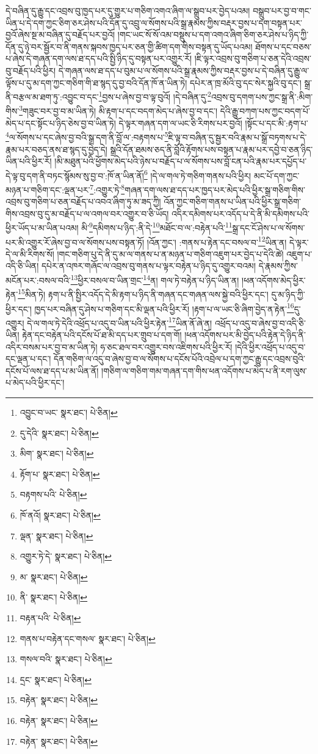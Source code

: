 དེ་བཞིན་དུ་རྒྱུ་དང་འབྲས་བུ་ཁྱད་པར་དུ་གྱུར་པ་གཅིག་འགའ་ཞིག་ལ་སྒྲུབ་པར་བྱེད་པའམ། བསྒྲུབ་པར་བྱ་བ་གང་ཡིན་པ་དེ་དག་ཀྱང་ཅིག་ཅར་ཤེས་པའི་དོན་དུ་འབྲུ་ལ་སོགས་པའི་སྒྲ་རྣམས་ཀྱིས་བརྡར་བྱས་པ་དག་བསྟན་པར་བྱའོ་ཞེས་སྔ་མ་བཞིན་དུ་བརྗོད་པར་བྱའོ། །གང་ཡང་སོ་སོ་འམ་བསྡུས་པ་དག་འགའ་ཞིག་ཅིག་ཅར་ཤེས་པ་ཉིད་ཀྱི་དོན་དུ་ཉེ་བར་སྦྱོར་བ་ནི་གནས་སྐབས་ཁྱད་པར་ཅན་གྱི་ཚིག་དག་གིས་བསྟན་དུ་ཡོད་པའམ། ཐོགས་པ་དང་བཅས་པ་ཞེས་དེ་གཞན་དག་ལས་ཐ་དད་པའི་སྤྱི་ཉིད་དུ་བསྟན་པར་འགྱུར་རོ། །ཇི་ལྟར་འབྲས་བུ་གཅིག་པ་ཅན་དེའི་འབྲས་བུ་བརྗོད་པའི་ཕྱིར། དེ་གཞན་ལས་ཐ་དད་པ་བུམ་པ་ལ་སོགས་པའི་སྒྲ་རྣམས་ཀྱིས་བརྡར་བྱས་པ་དེ་བཞིན་དུ་རྒྱུ་ལ་ལྟོས་པ་དུ་མ་དག་ཀྱང་གཅིག་གི་ཐ་སྙད་དུ་བྱ་བའི་དོན་ཁོ་ན་ཡིན་ཏེ། དཔེར་ན་ཁྲ་མོའི་བུ་དང་སེར་སྐྱའི་བུ་དང་། སྒྲ་ནི་བརྩལ་མ་ཐག་ཏུ་:འབྱུང་བ་དང་\footnote{འབྱུང་བ་ཡང་  སྣར་ཐང་།  པེ་ཅིན། }བྱས་པ་ཞེས་བྱ་བ་ལྟ་བུའོ། །དེ་བཞིན་དུ་\footnote{དུ་དེའི་  སྣར་ཐང་།  པེ་ཅིན། }འབྲས་བུ་དགག་པས་ཀྱང་སྒྲ་ནི་:མིག་གིས་\footnote{མིག་  སྣར་ཐང་།  པེ་ཅིན། }གཟུང་བར་བྱ་བ་མ་ཡིན་ཏེ། མི་རྟག་པ་དང་བདག་མེད་པ་ཞེས་བྱ་བ་དང་། དེའི་རྒྱུ་བཀག་པས་ཀྱང་བདག་པོ་མེད་པ་དང་སྟོང་པ་ཉིད་ཅེས་བྱ་བ་ཡིན་ཏེ། དེ་ལྟར་གཞན་དག་ལ་ཡང་ཅི་རིགས་པར་བྱའོ། །སྟོང་པ་དང་མི་:རྟག་པ་\footnote{རྟོག་པ་  སྣར་ཐང་།  པེ་ཅིན། }ལ་སོགས་པ་དང་ཞེས་བྱ་བའི་སྒྲ་དག་ནི་བློ་ལ་:བརྟགས་པ་\footnote{བརྟགས་པའི་  པེ་ཅིན། }ཇི་ལྟ་བ་བཞིན་དུ་སྦྱར་བའི་རྣམ་པ་སྒྲོ་བཏགས་པ་དེ་རྣམ་པར་བཅད་ནས་ཐ་སྙད་དུ་བྱེད་དེ། སྒྲའི་དོན་ཐམས་ཅད་ནི་བློའི་རྟོགས་པས་བསྟན་པ་རྣམ་པར་དབྱེ་བ་ཅན་ཉིད་ཡིན་པའི་ཕྱིར་རོ། །མི་མཐུན་པའི་ཕྱོགས་མེད་པའི་ཉེས་པ་བརྗོད་པ་ལ་སོགས་པས་བློ་ངན་པའི་རྣམ་པར་དཔྱོད་པ་དེ་ལྟ་བུ་དག་ནི་བཏང་སྙོམས་སུ་བྱ་བ་:ཁོ་ན་ཡིན་ནོ།\footnote{ཁོ་ནའོ།  སྣར་ཐང་།  པེ་ཅིན། } །དེ་ལ་གལ་ཏེ་གཅིག་གནས་པའི་ཕྱིར། མང་པོ་དག་ཀྱང་མཉན་པ་གཅིག་དང་:ལྡན་པར་\footnote{ལྡན་  སྣར་ཐང་།  པེ་ཅིན། }:འགྱུར་ཏེ་\footnote{འགྱུར་ཏེ་དེ་  སྣར་ཐང་།  པེ་ཅིན། }གཞན་དག་ལས་ཐ་དད་པར་ཁྱད་པར་མེད་པའི་ཕྱིར་སྒྲ་གཅིག་གིས་འབྲས་བུ་གཅིག་པ་ཅན་བརྗོད་པ་འབའ་ཞིག་ཏུ་མ་ཟད་ཀྱི། འོན་ཀྱང་གཅིག་གནས་པ་ཡིན་པའི་ཕྱིར་སྒྲ་གཅིག་གིས་འབྲས་བུ་དུ་མ་བརྗོད་པ་ལ་འགལ་བར་འགྱུར་བ་ཅི་ཡོད། འདིར་དམིགས་པར་འདོད་པ་དེ་ནི་མི་དམིགས་པའི་ཕྱིར་ཡོད་པ་མ་ཡིན་པའམ། མི་\footnote{མ་  སྣར་ཐང་།  པེ་ཅིན། }དམིགས་པ་ཉིད་:ནི་དེ་\footnote{ནི་  སྣར་ཐང་།  པེ་ཅིན། }མཐོང་བ་ལ་:བརྟེན་པའི་\footnote{བརྟན་པའི་  པེ་ཅིན། }སྒྲ་དང་ངོ་ཤེས་པ་ལ་སོགས་པར་མི་འགྱུར་རོ་ཞེས་བྱ་བ་ལ་སོགས་པས་བསྟན་ཏོ། །འོན་ཀྱང་། :གནས་པ་རྟེན་དང་བསལ་བ་\footnote{གནས་པ་བརྟེན་དང་གསལ་  སྣར་ཐང་།  པེ་ཅིན། }ཡིན་ན། དེ་ལྟར་དེ་ལ་མི་རིགས་སོ། །གང་གཅིག་པུ་དེ་ནི་དུ་མ་ལ་གནས་པ་ན་མཉན་པ་གཅིག་འཇུག་པར་བྱེད་པ་དེའི་ཚེ། འཇུག་པ་འདི་ཅི་ཡིན། དཔེར་ན་འཁར་གཞོང་ལ་འབྲས་བུ་གནས་པ་ལྟར་བརྟེན་པ་ཉིད་དུ་འགྱུར་བའམ། དེ་རྣམས་ཀྱིས་མངོན་པར་:བསལ་བའི་\footnote{གསལ་བའི་  སྣར་ཐང་།  པེ་ཅིན། }ཕྱིར་བསལ་བ་ཡིན་གྲང་\footnote{དྲང་  སྣར་ཐང་།  པེ་ཅིན། }ན། གལ་ཏེ་བརྟེན་པ་ཉིད་ཡིན་ན། །ཕན་འདོགས་མེད་ཕྱིར་རྟེན་\footnote{བརྟེན་  སྣར་ཐང་།  པེ་ཅིན། }མིན་ཏེ། རྟག་པ་ནི་སྤྱིར་འདོད་དེ་མི་རྟག་པ་ཉིད་ནི་གཞན་དང་གཞན་ལས་སྐྱེ་བའི་ཕྱིར་དང་། དུ་མ་ཉིད་ཀྱི་ཕྱིར་དང་། ཁྱད་པར་བཞིན་དུ་ཤེས་པ་གཅིག་དང་མི་ལྡན་པའི་ཕྱིར་རོ། །རྟག་པ་ལ་ཡང་ཅི་ཞིག་བྱེད་ན་རྟེན་\footnote{བརྟེན་  སྣར་ཐང་།  པེ་ཅིན། }དུ་འགྱུར། དེ་ལ་གལ་ཏེ་དེའི་འཕྲོད་པ་འདུ་བ་ཡིན་པའི་ཕྱིར་རྟེན་\footnote{བརྟེན་  སྣར་ཐང་།  པེ་ཅིན། }ཡིན་ནོ་ཞེ་ན། འཕྲོད་པ་འདུ་བ་ཞེས་བྱ་བ་འདི་ཅི་ཡིན། རྟེན་དང་བརྟེན་པའི་དངོས་པོ་ཐ་མི་དད་པར་གྲུབ་པ་དག་གོ། །ཕན་འདོགས་པར་མི་བྱེད་པའི་རྟེན་དེ་ཉིད་ནི་འདིར་བསམ་པར་བྱ་བ་མ་ཡིན་ཏེ། ཧ་ཅང་ཐལ་བར་འགྱུར་བས་འཇིགས་པའི་ཕྱིར་རོ། །དེའི་ཕྱིར་འཕྲོད་པ་འདུ་བ་དང་ལྡན་པ་དང་། དོན་གཅིག་ལ་འདུ་བ་ཞེས་བྱ་བ་ལ་སོགས་པ་དངོས་པོའི་འབྲེལ་པ་དག་ཀྱང་རྒྱུ་དང་འབྲས་བུའི་དངོས་པོ་ལས་ཐ་དད་པ་མ་ཡིན་ནོ། །གཅིག་ལ་གཅིག་གམ་གཞན་དག་གིས་ཕན་འདོགས་པ་མེད་པ་ནི་རག་ལུས་པ་མེད་པའི་ཕྱིར་དང་། 